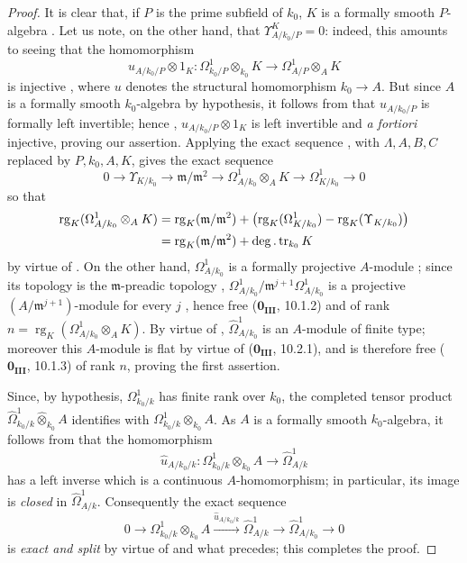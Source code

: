 \begin{proof}
It is clear that, if $P$ is the prime subfield of $k_0$, $K$ is a formally smooth $P$-algebra .
Let us note, on the other hand, that $\Upsilon^K_{A/k_0/P}=0$: indeed, this amounts to seeing that the homomorphism
\[
  u_{A/k_0/P}\otimes 1_K:\Omega^1_{k_0/P}\otimes_{k_0}K
  \longrightarrow\Omega^1_{A/P}\otimes_AK
\]
is injective , where $u$ denotes the structural homomorphism $k_0\to A$.
But since $A$ is a formally smooth $k_0$-algebra by hypothesis, it follows from  that $u_{A/k_0/P}$ is formally left invertible; hence , $u_{A/k_0/P}\otimes1_K$ is left invertible and \emph{a fortiori} injective, proving our assertion.
Applying the exact sequence , with $\Lambda,A,B,C$ replaced by $P,k_0,A,K$, gives the exact sequence
\[
  0\longrightarrow\Upsilon_{K/k_0}
  \longrightarrow\mathfrak{m}/\mathfrak{m}^2
  \longrightarrow\Omega^1_{A/k_0}\otimes_AK
  \longrightarrow\Omega^1_{K/k_0}\longrightarrow0
\]
so that
\[
\begin{split}
  \operatorname{rg}_K(\Omega^1_{A/k_0}\otimes_AK)
  &={\operatorname{rg}}_K(\mathfrak{m}/\mathfrak{m}^2)
    +\bigl(\operatorname{rg}_K(\Omega^1_{K/k_0})
    -\operatorname{rg}_K(\Upsilon_{K/k_0})\bigr)\\
  &={\operatorname{rg}}_K(\mathfrak{m}/\mathfrak{m}^2)
    +\deg.\operatorname{tr}_{k_0}K
\end{split}
\]
by virtue of .
On the other hand, $\Omega^1_{A/k_0}$ is a formally projective $A$-module ; since its topology is the $\mathfrak{m}$-preadic topology ,
$\Omega^1_{A/k_0}/\mathfrak{m}^{j+1}\Omega^1_{A/k_0}$ is a projective $(A/\mathfrak{m}^{j+1})$-module for every $j$ , hence free ($\mathbf{0_{III}}$, 10.1.2) and of rank
$n=\operatorname{rg}_K(\Omega^1_{A/k_0}\otimes_AK)$.
By virtue of , $\widehat{\Omega}^1_{A/k_0}$ is an $A$-module of finite type; moreover this $A$-module is flat by virtue of ($\mathbf{0_{III}}$, 10.2.1), and is therefore free ($\mathbf{0_{III}}$, 10.1.3) of rank $n$, proving the first assertion.

Since, by hypothesis, $\Omega^1_{k_0/k}$ has finite rank over $k_0$, the completed tensor product $\widehat\Omega^1_{k_0/k}\widehat{\otimes}_{k_0}A$ identifies with $\Omega^1_{k_0/k}\otimes_{k_0}A$.
As $A$ is a formally smooth $k_0$-algebra, it follows from  that the homomorphism
\[
  \widehat{u}_{A/k_0/k}:\Omega^1_{k_0/k}\otimes_{k_0}A
  \longrightarrow\widehat{\Omega}^1_{A/k}
\]
has a left inverse which is a continuous $A$-homomorphism; in particular, its image is \emph{closed} in $\widehat{\Omega}^1_{A/k}$.
Consequently the exact sequence
\[
  0\longrightarrow\Omega^1_{k_0/k}\otimes_{k_0}A
  \xrightarrow{\widehat{u}_{A/k_0/k}}\widehat{\Omega}^1_{A/k}
  \longrightarrow\widehat{\Omega}^1_{A/k_0}\longrightarrow0
\]
is \emph{exact and split} by virtue of  and what precedes; this completes the proof.
\end{proof}

